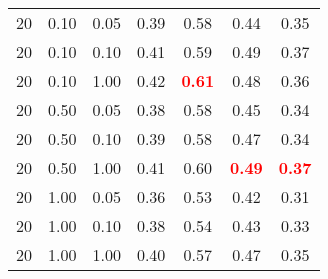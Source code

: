 \begin{tabular}{lllcccc}
20 & 0.10 & 0.05 & 0.39 & 0.58 & 0.44 & 0.35 \\ 
20 & 0.10 & 0.10 & 0.41 & 0.59 & 0.49 & 0.37 \\ 
20 & 0.10 & 1.00 & 0.42 & \textbf{\textcolor{red}{0.61}} & 0.48 & 0.36 \\ 
20 & 0.50 & 0.05 & 0.38 & 0.58 & 0.45 & 0.34 \\ 
20 & 0.50 & 0.10 & 0.39 & 0.58 & 0.47 & 0.34 \\ 
20 & 0.50 & 1.00 & 0.41 & 0.60 & \textbf{\textcolor{red}{0.49}} & \textbf{\textcolor{red}{0.37}} \\ 
20 & 1.00 & 0.05 & 0.36 & 0.53 & 0.42 & 0.31 \\ 
20 & 1.00 & 0.10 & 0.38 & 0.54 & 0.43 & 0.33 \\ 
20 & 1.00 & 1.00 & 0.40 & 0.57 & 0.47 & 0.35 \\ 
\end{tabular} 
